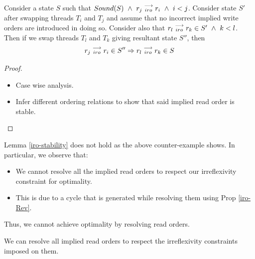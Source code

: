         \begin{lemma}
            \label{iro-stability}
            Consider a state $S$ such that $Sound(S) \ \wedge \ \reln{r_j}{iro}{r_i} \ \wedge \ i < j$.
            Consider state $S'$ after swapping threads $T_i$ and $T_j$ and assume that no incorrect implied write orders are introduced in doing so. 
            Consider also that $r_l\stackrel{\longrightarrow}{_{iro}}r_k \in S' \ \wedge \ k < l$.
            Then if we swap threads $T_l$ and $T_k$ giving resultant state $S''$, then 
            \begin{align*}
                r_j\stackrel{\longrightarrow}{_{iro}}r_i \in S'' 
                \Rightarrow
                r_l\stackrel{\longrightarrow}{_{iro}}r_k \in S
            \end{align*} 
        \end{lemma}

        \begin{proof}


            \begin{itemize}
                \item Case wise analysis.
                \item Infer different ordering relations to show that said implied read order is stable.
            \end{itemize}

        \end{proof}

        Lemma \ref{iro-stability} does not hold as the above counter-example shows.
        In particular, we observe that:
        \begin{itemize}
            \item We cannot resolve all the implied read orders to respect our irreflexivity constraint for optimality.
            \item This is due to a cycle that is generated while resolving them using Prop \ref{iro-Rev}.
        \end{itemize}

        Thus, we cannot achieve optimality by resolving read orders. 

        \begin{theorem}
            \label{fwdprog-iro}
            We can resolve all implied read orders to respect the irreflexivity constraints imposed on them.
        \end{theorem}

